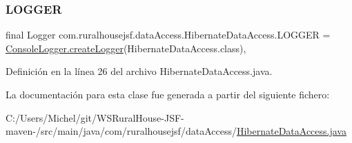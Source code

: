 \subsubsection{\texorpdfstring{LOGGER}{LOGGER}}
{\footnotesize\ttfamily final Logger com.\+ruralhousejsf.\+data\+Access.\+Hibernate\+Data\+Access.\+L\+O\+G\+G\+ER = \mbox{\hyperlink{classcom_1_1ruralhousejsf_1_1logger_1_1_console_logger_a520321643663e37d95761134a35505cd}{Console\+Logger.\+create\+Logger}}(Hibernate\+Data\+Access.\+class)\hspace{0.3cm}{\ttfamily [static]}, {\ttfamily [private]}}



Definición en la línea 26 del archivo Hibernate\+Data\+Access.\+java.



La documentación para esta clase fue generada a partir del siguiente fichero\+:\begin{DoxyCompactItemize}
\item 
C\+:/\+Users/\+Michel/git/\+W\+S\+Rural\+House-\/\+J\+S\+F-\/maven-\//src/main/java/com/ruralhousejsf/data\+Access/\mbox{\hyperlink{_hibernate_data_access_8java}{Hibernate\+Data\+Access.\+java}}\end{DoxyCompactItemize}
